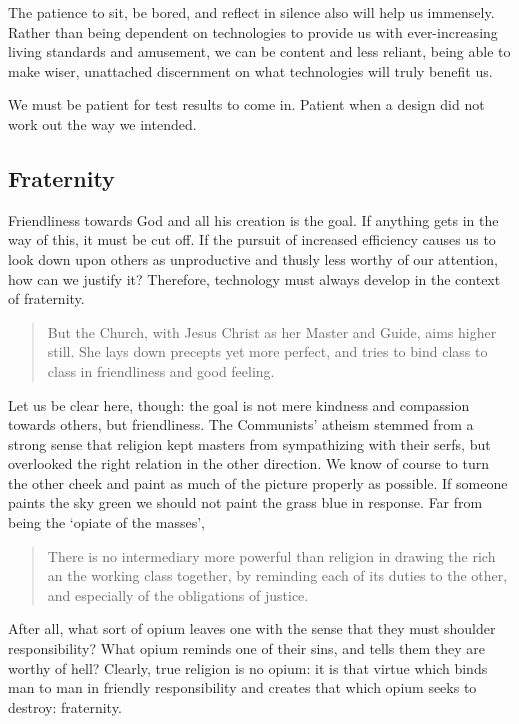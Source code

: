 \documentclass[letterpaper]{article}
\begin{document}
The patience to sit, be bored, and reflect in silence also will help us immensely. Rather than being dependent on technologies to provide us with ever-increasing living standards and amusement, we can be content and less reliant, being able to make wiser, unattached discernment on what technologies will truly benefit us.

We must be patient for test results to come in. Patient when a design did not work out the way we intended.

\subsection{Fraternity}

Friendliness towards God and all his creation is the goal. If anything gets in the way of this, it must be cut off. If the pursuit of increased efficiency causes us to look down upon others as unproductive and thusly less worthy of our attention, how can we justify it? Therefore, technology must always develop in the context of fraternity.

\begin{quote}
  But the Church, with Jesus Christ as her Master and Guide, aims higher still. She lays down precepts yet more perfect, and tries to bind class to class in friendliness and good feeling.
\end{quote}

Let us be clear here, though: the goal is not mere kindness and compassion towards others, but friendliness. The Communists' atheism stemmed from a strong sense that religion kept masters from sympathizing with their serfs, but overlooked the right relation in the other direction. We know of course to turn the other cheek and paint as much of the picture properly as possible. If someone paints the sky green we should not paint the grass blue in response. Far from being the `opiate of the masses',

\begin{quote}
  There is no intermediary more powerful than religion in drawing the rich an the working class together, by reminding each of its duties to the other, and especially of the obligations of justice.
\end{quote}

After all, what sort of opium leaves one with the sense that they must shoulder responsibility? What opium reminds one of their sins, and tells them they are worthy of hell? Clearly, true religion is no opium: it is that virtue which binds man to man in friendly responsibility and creates that which opium seeks to destroy: fraternity.
\end{document}
